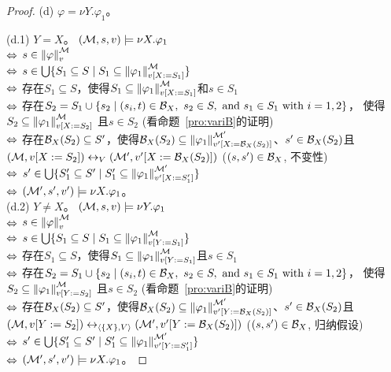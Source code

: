 \begin{proof}
	
	(d) $\varphi = \nu Y. \varphi_1$。
	
	(d.1) $Y =X$。
	$({\cal M},s,v) \models \nu X. \varphi_1$ \\
	$\Leftrightarrow$ $s \in \left\|\varphi\right\|_v^{{\cal M}}$\\
	$\Leftrightarrow$ $s \in \bigcup\{S_1 \subseteq S\mid S_1 \subseteq \left\|\varphi_1\right\|_{v[X:=S_1]}^{{\cal M}}\}$\\
	$\Leftrightarrow$ 存在$S_1 \subseteq S$，使得$S_1 \subseteq \left\|\varphi_1\right\|_{v[X:=S_1]}^{{\cal M}}$和$s\in S_1$\\
	$\Leftrightarrow$ 存在$S_2=S_1 \cup \{s_2\mid (s_i,t) \in {\cal B}_X, ~s_2\in S, \hbox{ and } s_1 \in S_1 \hbox{ with }i=1,2\}$，
	使得$S_2 \subseteq \left\|\varphi_1\right\|_{v[X:=S_2]}^{{\cal M}}$ 且$s\in S_2$ \hfill (看命题~\ref{pro:variB}的证明)\\
	$\Leftrightarrow$ 存在${\cal B}_X(S_2) \subseteq S'$，使得${\cal B}_X(S_2) \subseteq \left\|\varphi_1\right\|_{v'[X:={\cal B}_X(S_2)]}^{{\cal M}'}$、$s'\in {\cal B}_X(S_2)$且 $({\cal M},v[X:=S_2]) \leftrightarrow_V ({\cal M}',v'[X:={\cal B}_X(S_2)])$ \hfill ($(s,s') \in {\cal B}_X$, 不变性)\\
	$\Leftrightarrow$ $s'\in \bigcup\{S_1' \subseteq S'\mid S_1' \subseteq \left\|\varphi_1\right\|_{v'[X:=S_1']}^{{\cal M}'}\}$\\
	$\Leftrightarrow$ $({\cal M}',s',v') \models \nu X. \varphi_1$。\\
	
	(d.2) $Y \not =X$。
	$({\cal M},s,v) \models \nu Y. \varphi_1$ \\
	$\Leftrightarrow$ $s \in \left\|\varphi\right\|_v^{{\cal M}}$\\
	$\Leftrightarrow$ $s \in \bigcup\{S_1 \subseteq S\mid S_1 \subseteq \left\|\varphi_1\right\|_{v[Y:=S_1]}^{{\cal M}}\}$\\
	$\Leftrightarrow$ 存在$S_1 \subseteq S$，使得$S_1 \subseteq \left\|\varphi_1\right\|_{v[Y:=S_1]}^{{\cal M}}$且$s\in S_1$\\
	$\Leftrightarrow$ 存在$S_2=S_1 \cup \{s_2\mid (s_i,t) \in {\cal B}_X, ~s_2\in S, \hbox{ and } s_1 \in S_1 \hbox{ with }i=1,2\}$，
	使得$S_2 \subseteq \left\|\varphi_1\right\|_{v[Y:=S_2]}^{{\cal M}}$ 且$s\in S_2$ \hfill (看命题~\ref{pro:variB}的证明)\\
	$\Leftrightarrow$ 存在${\cal B}_X(S_2) \subseteq S'$，使得${\cal B}_X(S_2) \subseteq \left\|\varphi_1\right\|_{v'[Y:={\cal B}_X(S_2)]}^{{\cal M}'}$、$s'\in {\cal B}_X(S_2)$且 $({\cal M},v[Y:=S_2]) \leftrightarrow_{{\langle{\{X\}, V}\rangle}} ({\cal M}',v'[Y:={\cal B}_X(S_2)])$ \hfill ($(s,s') \in {\cal B}_X$, 归纳假设)\\
	$\Leftrightarrow$ $s'\in \bigcup\{S_1' \subseteq S'\mid S_1' \subseteq \left\|\varphi_1\right\|_{v'[Y:=S_1']}^{{\cal M}'}\}$\\
	$\Leftrightarrow$ $({\cal M}',s',v') \models \nu X. \varphi_1$。
\end{proof}


